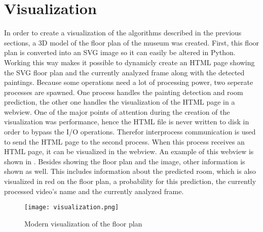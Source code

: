 \section{Visualization}

In order to create a visualization of the algorithms described in the previous sections, a 3D model of the floor plan of the museum was created. First, this floor plan is converted into an SVG image so it can easily be altered in Python. Working this way makes it possible to dynamicly create an HTML page showing the SVG floor plan and the currently analyzed frame along with the detected paintings. Because some operations need a lot of processing power, two seperate processes are spawned. One process handles the painting detection and room prediction, the other one handles the visualization of the HTML page in a webview. One of the major points of attention during the creation of the visualization was performance, hence the HTML file is never written to disk in order to bypass the I/O operations. Therefor interprocess communication is used to send the HTML page to the second process. When this process receives an HTML page, it can be visualized in the webview. An example of this webview is shown in . Besides showing the floor plan and the image, other information is shown as well. This includes information about the predicted room, which is also visualized in red on the floor plan, a probability for this prediction, the currently processed video's name and the currently analyzed frame.

\begin{figure}
    \centering
    \texttt{[image: visualization.png]}
    \label{fig:webview}
    \caption{Modern visualization of the floor plan}
\end{figure}
